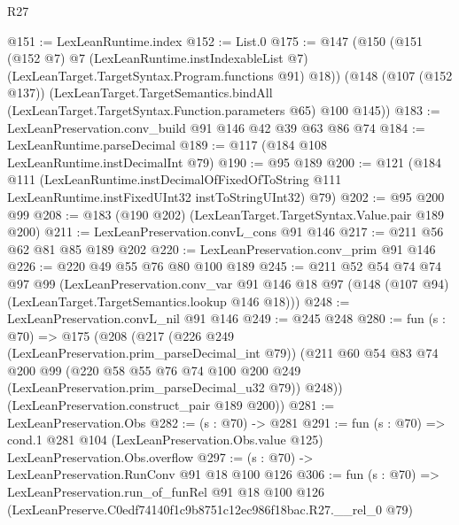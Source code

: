 \begin{lexlean}{R27}
\begin{coremodule}
@151 := LexLeanRuntime.index
@152 := List.{0}
@175 := @147
    (@150
      (@151
        (@152 @7)
        @7
        (LexLeanRuntime.instIndexableList @7)
        (LexLeanTarget.TargetSyntax.Program.functions @91)
        @18))
    (@148
      (@107 (@152 @137))
      (LexLeanTarget.TargetSemantics.bindAll
        (LexLeanTarget.TargetSyntax.Function.parameters @65)
        @100
        @145))
@183 := LexLeanPreservation.conv_build @91 @146 @42 @39 @63 @86 @74
@184 := LexLeanRuntime.parseDecimal
@189 := @117 (@184 @108 LexLeanRuntime.instDecimalInt @79)
@190 := @95 @189
@200 := @121
    (@184
      @111
      (LexLeanRuntime.instDecimalOfFixedOfToString
        @111
        LexLeanRuntime.instFixedUInt32
        instToStringUInt32)
      @79)
@202 := @95 @200 @99
@208 := @183 (@190 @202) (LexLeanTarget.TargetSyntax.Value.pair @189 @200)
@211 := LexLeanPreservation.convL_cons @91 @146
@217 := @211 @56 @62 @81 @85 @189 @202
@220 := LexLeanPreservation.conv_prim @91 @146
@226 := @220 @49 @55 @76 @80 @100 @189
@245 := @211
    @52
    @54
    @74
    @74
    @97
    @99
    (LexLeanPreservation.conv_var
      @91
      @146
      @18
      @97
      (@148 (@107 @94) (LexLeanTarget.TargetSemantics.lookup @146 @18)))
@248 := LexLeanPreservation.convL_nil @91 @146
@249 := @245 @248
@280 := fun (s : @70) =>
  @175
    (@208
      (@217
        (@226 @249 (LexLeanPreservation.prim_parseDecimal_int @79))
        (@211
          @60
          @54
          @83
          @74
          @200
          @99
          (@220 @58 @55 @76 @74 @100 @200 @249 (LexLeanPreservation.prim_parseDecimal_u32 @79))
          @248))
      (LexLeanPreservation.construct_pair @189 @200))
@281 := LexLeanPreservation.Obs
@282 := (s : @70) -> @281
@291 := fun (s : @70) =>
  cond.{1} @281 @104 (LexLeanPreservation.Obs.value @125) LexLeanPreservation.Obs.overflow
@297 := (s : @70) -> LexLeanPreservation.RunConv @91 @18 @100 @126
@306 := fun (s : @70) =>
  LexLeanPreservation.run_of_funRel
    @91
    @18
    @100
    @126
    (LexLeanPreserve.C0edf74140f1c9b8751c12ec986f18bac.R27.__rel_0 @79)
\end{coremodule}
\end{lexlean}
